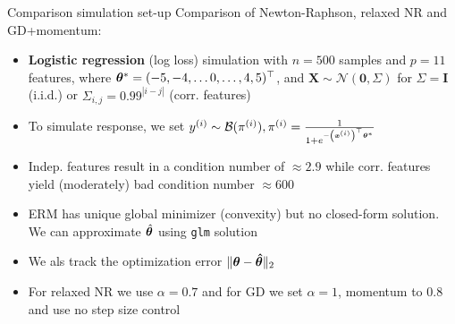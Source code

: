 \documentclass[11pt,compress,t,notes=noshow, xcolor=table]{beamer}
\begin{document}
\begin{vbframe}{Comparison simulation set-up}
Comparison of Newton-Raphson, relaxed NR and GD+momentum:
{\normalsize
\begin{itemize}\setlength{\itemsep}{0.75em} 
    \item \textbf{Logistic regression} (log loss) simulation with $n=500$ samples and $p=11$ features, where $\bm{\theta}^{\ast}=(-5,-4,\ldots0,\ldots,4,5)^{\top}$, and $\bm{X} \sim \mathcal{N}(\bm{0}, \Sigma)$ for $\Sigma=\bm{I}$ (i.i.d.) or $\Sigma_{i,j}=0.99^{|i-j|}$ (corr. features)
    \item To simulate response, we set $y^{(i)} \sim \mathcal{B}(\pi^{(i)}), \pi^{(i)} = \frac{1}{1+e^{-\left(\bm{x}^{(i)}\right)^{\top}\bm{\theta}^{\ast}}}$
    \item Indep. features result in a condition number of $\approx 2.9$ while corr. features yield (moderately) bad condition number $\approx 600$
    \item ERM has unique global minimizer (convexity) but no closed-form solution. We can approximate $\hat{\bm{\theta}}$ using \texttt{glm} solution
    \item We als track the optimization error $\Vert \bm{\theta} - \bm{\hat{\theta}} \Vert_2$
    \item For relaxed NR we use $\alpha=0.7$ and for GD we set $\alpha=1$, momentum to $0.8$ and use no step size control
\end{itemize}
}
\end{vbframe}


\end{document}
